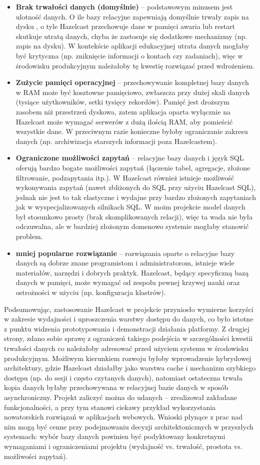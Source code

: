 \begin{itemize}
\item \textbf{Brak trwałości danych (domyślnie)} – podstawowym minusem jest ulotność danych. O ile bazy relacyjne zapewniają domyślnie trwały zapis na dysku , o tyle Hazelcast przechowuje dane w pamięci awaria lub restart skutkuje utratą danych, chyba że zastosuje się dodatkowe mechanizmy (np. zapis  na dysku). W kontekście aplikacji edukacyjnej utrata danych mogłaby być krytyczna (np. zniknięcie informacji o kontach czy zadaniach), więc w środowisku produkcyjnym należałoby tę kwestię rozwiązać przed wdrożeniem.
\item \textbf{Zużycie pamięci operacyjnej} – przechowywanie kompletnej bazy danych w RAM może być kosztowne pamięciowo, zwłaszcza przy dużej skali danych (tysiące użytkowników, setki tysięcy rekordów). Pamięć jest droższym zasobem niż przestrzeń dyskowa, zatem aplikacja oparta wyłącznie na Hazelcast może wymagać serwerów z dużą ilością RAM, aby pomieścić wszystkie dane. W przeciwnym razie konieczne byłoby ograniczanie zakresu danych (np. archiwizacja starszych informacji poza Hazelcastem).
\item \textbf{Ograniczone możliwości zapytań} – relacyjne bazy danych i język SQL oferują bardzo bogate możliwości zapytań (łączenie tabel, agregacje, złożone filtrowanie, podzapytania itp.). W Hazelcast również istnieje możliwość wykonywania zapytań (nawet zbliżonych do SQL przy użyciu Hazelcast SQL), jednak nie jest to tak elastyczne i wydajne przy bardzo złożonych zapytaniach jak w wyspecjalizowanych silnikach SQL. W moim projekcie model danych był stosunkowo prosty (brak skomplikowanych relacji), więc ta wada nie była odczuwalna, ale w bardziej złożonym domenowo systemie mogłaby stanowić problem.
\item \textbf{mniej popularne rozwiązanie} – rozwiązania oparte o relacyjne bazy danych są dobrze znane programistom i administratorom, istnieje wiele materiałów, narzędzi i dobrych praktyk. Hazelcast, będący specyficzną bazą danych w pamięci, może wymagać od zespołu pewnej krzywej nauki oraz ostrożności w użyciu (np. konfiguracja klastrów).
\end{itemize} Podsumowując, zastosowanie Hazelcast w projekcie przyniosło wymierne korzyści w zakresie wydajności i uproszczenia warstwy dostępu do danych, co było istotne z punktu widzenia prototypowania i demonstracji działania platformy. Z drugiej strony, zdano sobie sprawę z ograniczeń takiego podejścia w szczególności kwestii trwałości danych co należałoby adresować przed użyciem systemu w środowisku produkcyjnym. Możliwym kierunkiem rozwoju byłoby wprowadzenie hybrydowej architektury, gdzie Hazelcast działałby jako warstwa cache i mechanizm szybkiego dostępu (np. do sesji i często czytanych danych), natomiast ostateczna trwała kopia danych byłaby przechowywana w relacyjnej bazie danych w sposób asynchroniczny. Projekt zaliczyć można do udanych – zrealizował zakładane funkcjonalności, a przy tym stanowi ciekawy przykład wykorzystania nowatorskich rozwiązań w aplikacjach webowych. Wnioski płynące z prac nad nim mogą być cenne przy podejmowaniu decyzji architektonicznych w przyszłych systemach: wybór bazy danych powinien być podyktowany konkretnymi wymaganiami i ograniczeniami projektu (wydajność vs. trwałość, prostota vs. możliwości zapytań).